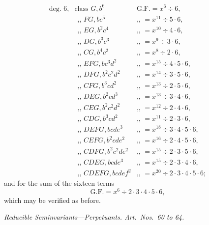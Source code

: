 \documentclass[11pt]{article}
\begin{document}
\[
\begin{array}{lll}
\text{deg.\ 6,} & \text{class } G, b^6 & \text{G.F.}= x^6 \div 6, \\
                & \text{$\ \ $,, } FG, bc^5 & \text{,, } = x^{11} \div 5 \cdot 6, \\
                & \text{$\ \ $,, } EG, b^2c^4 & \text{,, } = x^{10} \div 4 \cdot 6, \\
                & \text{$\ \ $,, } DG, b^3c^3 & \text{,, } = x^9 \div 3 \cdot 6, \\
                & \text{$\ \ $,, } CG, b^4c^2 & \text{,, } = x^8 \div 2 \cdot 6, \\
                & \text{$\ \ $,, } EFG, bc^3d^2 & \text{,, } = x^{15} \div 4 \cdot 5 \cdot 6, \\
                & \text{$\ \ $,, } DFG, b^2c^2d^2 & \text{,, } = x^{14} \div 3 \cdot 5 \cdot 6, \\
                & \text{$\ \ $,, } CFG, b^3cd^2 & \text{,, } = x^{13} \div 2 \cdot 5 \cdot 6, \\
                & \text{$\ \ $,, } DEG, b^2cd^3 & \text{,, } = x^{13} \div 3 \cdot 4 \cdot 6, \\
                & \text{$\ \ $,, } CEG, b^2c^2d^2 & \text{,, } = x^{12} \div 2 \cdot 4 \cdot 6, \\
                & \text{$\ \ $,, } CDG, b^3cd^2 & \text{,, } = x^{11} \div 2 \cdot 3 \cdot 6, \\
                & \text{$\ \ $,, } DEFG, bcde^3 & \text{,, } = x^{18} \div 3 \cdot 4 \cdot 5 \cdot 6, \\
                & \text{$\ \ $,, } CEFG, b^2cde^2 & \text{,, } = x^{16} \div 2 \cdot 4 \cdot 5 \cdot 6, \\
                & \text{$\ \ $,, } CDFG, b^2c^2de^2 & \text{,, } = x^{15} \div 2 \cdot 3 \cdot 5 \cdot 6, \\
                & \text{$\ \ $,, } CDEG, bcde^3 & \text{,, } = x^{15} \div 2 \cdot 3 \cdot 4 \cdot 6, \\
                & \text{$\ \ $,, } CDEFG, bcdef^2 & \text{,, } = x^{20} \div 2 \cdot 3 \cdot 4 \cdot 5 \cdot 6;
\end{array}
\]
and for the sum of the sixteen terms
\[
\text{G.F.}= x^6 \div 2 \cdot 3 \cdot 4 \cdot 5 \cdot 6,
\]
which may be verified as before.

\medskip
\begin{center}
\textit{Reducible Seminvariants---Perpetuants. Art.\ Nos.\ 60 to 64.}
\end{center}
\end{document}
